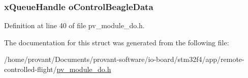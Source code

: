 \subsubsection[{\texorpdfstring{o\+Control\+Beagle\+Data}{oControlBeagleData}}]{\setlength{\rightskip}{0pt plus 5cm}x\+Queue\+Handle o\+Control\+Beagle\+Data}\hypertarget{structpv__interface__do_a4ed79d3529d7b97899602893078332b0}{}\label{structpv__interface__do_a4ed79d3529d7b97899602893078332b0}


Definition at line 40 of file pv\+\_\+module\+\_\+do.\+h.



The documentation for this struct was generated from the following file\+:\begin{DoxyCompactItemize}
\item 
/home/provant/\+Documents/provant-\/software/io-\/board/stm32f4/app/remote-\/controlled-\/flight/\hyperlink{pv__module__do_8h}{pv\+\_\+module\+\_\+do.\+h}\end{DoxyCompactItemize}

